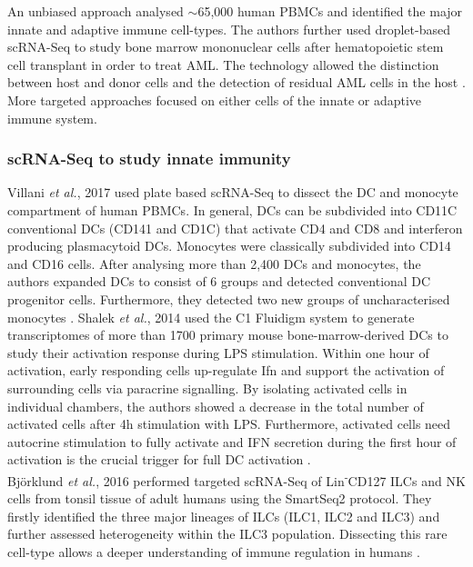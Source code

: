 An unbiased approach analysed $\sim$65,000 human \glspl{PBMC} and identified the major innate and adaptive immune cell-types. The authors further used droplet-based scRNA-Seq to study bone marrow mononuclear cells after hematopoietic stem cell transplant in order to treat \gls{AML}. The technology allowed the distinction between host and donor cells and the detection of residual AML cells in the host \citep{Zheng2017}. \\

More targeted approaches focused on either cells of the innate or adaptive immune system.

\subsubsection{scRNA-Seq to study innate immunity}

Villani \emph{et al.}, 2017 used plate based scRNA-Seq to dissect the \gls{DC} and monocyte compartment of human \glspl{PBMC}. In general, DCs can be subdivided into CD11C\plus{} conventional DCs (CD141\plus{} and CD1C\plus{}) that activate CD4\plus{} and CD8\plus{} and interferon producing plasmacytoid DCs. Monocytes were classically subdivided into CD14\plus{} and CD16\plus{} cells. After analysing more than 2,400 DCs and monocytes, the authors expanded DCs to consist of 6 groups and detected conventional DC progenitor cells. Furthermore, they detected two new groups of uncharacterised monocytes \citep{Villani2017}. Shalek \emph{et al.}, 2014 used the C1 Fluidigm system to generate transcriptomes of more than 1700 primary mouse bone-marrow-derived DCs to study their activation response during \gls{LPS} stimulation. Within one hour of activation, early responding cells up-regulate \gls{Ifn}\textbeta{} and support the activation of surrounding cells via paracrine signalling. By isolating activated cells in individual chambers, the authors showed a decrease in the total number of activated cells after 4h stimulation with LPS. Furthermore, activated cells need autocrine stimulation to fully activate and IFN\textbeta{} secretion during the first hour of activation is the crucial trigger for full DC activation \citep{Shalek2014}. \\

Bj\"o{}rklund \emph{et al.}, 2016 performed targeted scRNA-Seq of Lin\textsuperscript{-}CD127\plus{} \glspl{ILC} and NK cells from tonsil tissue of adult humans using the SmartSeq2 protocol. They firstly identified the three major lineages of ILCs (ILC1, ILC2 and ILC3) and further assessed heterogeneity within the ILC3 population. Dissecting this rare cell-type allows a deeper understanding of immune regulation in humans \citep{Bjorklund2016}. 

